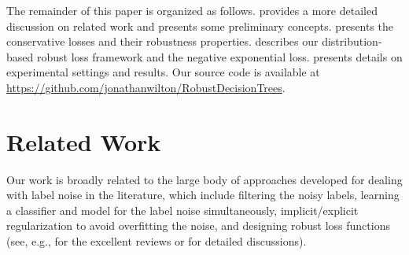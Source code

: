 \documentclass[letterpaper]{article} %
\begin{document}
The remainder of this paper is organized as follows.
 provides a more detailed discussion on related work and
 presents some preliminary concepts.
 presents the conservative losses and their robustness
properties.
 describes our distribution-based robust loss framework
and the negative exponential loss.
 presents details on experimental settings and results.
Our source code is available at \url{https://github.com/jonathanwilton/RobustDecisionTrees}.

\section{Related Work} \label{sec:related}

Our work is broadly related to the large body of approaches developed for
dealing with label noise in the literature, which include filtering the noisy
labels, learning a classifier and model for the label noise simultaneously,
implicit/explicit regularization to avoid overfitting the noise,
and designing robust loss functions (see, e.g., for the excellent reviews
\cite{frenay2013classification} or \cite{song2022learning} for detailed
discussions).
\end{document}
